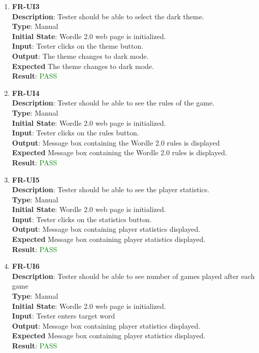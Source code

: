 \documentclass[12pt, titlepage]{article}
\begin{document}
\begin{enumerate}
	\item \textbf{FR-UI3\\}
	\textbf{Description}: Tester should be able to select the dark theme.\\
	\textbf{Type}: Manual\\
	\textbf{Initial State}: Wordle 2.0 web page is initialized.\\
	\textbf{Input}: Tester clicks on the theme button.\\
	\textbf{Output}: The theme changes to dark mode.\\
	\textbf{Expected} The theme changes to dark mode.\\
	\textbf{Result}: \textcolor{green}{PASS}\\
	
	\item \textbf{FR-UI4\\}
	\textbf{Description}: Tester should be able to see the rules of the game.\\
	\textbf{Type}: Manual\\
	\textbf{Initial State}: Wordle 2.0 web page is initialized.\\
	\textbf{Input}: Tester clicks on the rules button.\\
	\textbf{Output}: Message box containing the Wordle 2.0 rules is displayed  \\
	\textbf{Expected} Message box containing the Wordle 2.0 rules is displayed.\\
	\textbf{Result}: \textcolor{green}{PASS}\\
	
	\item \textbf{FR-UI5\\}
	\textbf{Description}: Tester should be able to see the player statistics.\\
	\textbf{Type}: Manual\\
	\textbf{Initial State}: Wordle 2.0 web page is initialized.\\
	\textbf{Input}: Tester clicks on the statistics button.\\
	\textbf{Output}: Message box containing player statistics displayed.\\
	\textbf{Expected} Message box containing player statistics displayed.\\
	\textbf{Result}: \textcolor{green}{PASS}\\
	
	\item \textbf{FR-UI6\\}
	\textbf{Description}: Tester should be able to see number of games played after each game\\
	\textbf{Type}: Manual\\
	\textbf{Initial State}: Wordle 2.0 web page is initialized.\\
	\textbf{Input}: Tester enters target word\\
	\textbf{Output}: Message box containing player statistics displayed.\\
	\textbf{Expected} Message box containing player statistics displayed.\\
	\textbf{Result}: \textcolor{green}{PASS}\\
	

\end{enumerate}
\end{document}
